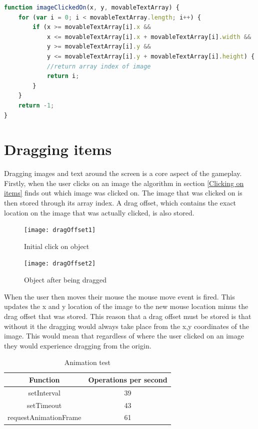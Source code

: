 \documentclass[12pt,a4paper]{report}
\begin{document}
\begin{minipage}{\linewidth}
\begin{lstlisting}[language=JavaScript]
function imageClickedOn(x, y, movableTextArray) {
    for (var i = 0; i < movableTextArray.length; i++) {
        if (x >= movableTextArray[i].x &&
            x <= movableTextArray[i].x + movableTextArray[i].width &&
            y >= movableTextArray[i].y &&
            y <= movableTextArray[i].y + movableTextArray[i].height) {
            //return array index of image
            return i;
        }
    }
    return -1;
}
\end{lstlisting}
\end{minipage}

\section{Dragging items}
Dragging images and text around the screen is a core aspect of the gameplay.
Firstly, when the user clicks on an image the algorithm in section \ref{Clicking on items} finds out which image was clicked on. The image that was clicked on is then stored through its array index. A drag offset, which contains the exact location on the image that was actually clicked, is also stored.

\begin{figure}[!h]
  \centering
  \begin{minipage}[b]{0.4\textwidth}
    \texttt{[image: dragOffset1]}
    \caption{Initial click on object}
  \end{minipage}
  \hfill
  \begin{minipage}[b]{0.4\textwidth}
    \texttt{[image: dragOffset2]}
    \caption{Object after being dragged}
  \end{minipage}
\end{figure}
\FloatBarrier


When the user then moves their mouse the mouse move event is fired. This updates the x and y location of the image to the new mouse location minus the drag offset that was stored. This reason that a drag offset must be stored is that without it the dragging would always take place from the x,y coordinates of the image. This would mean that regardless of where the user clicked on an image they would experience dragging from the origin.


\begin{table}[ht]
\centering
\begin{adjustbox}{width=1\textwidth}
\small
\begin{tabular}{ c | c }
  \hline
 Function & Operations per second \\ \hline 
    setInterval & 39 \\
    setTimeout & 43 \\
    requestAnimationFrame & 61 \\
   \hline
\end{tabular}
\end{adjustbox}
\caption{Animation test} 
\label{table:animatetest}
\end{table} 
\end{document}
